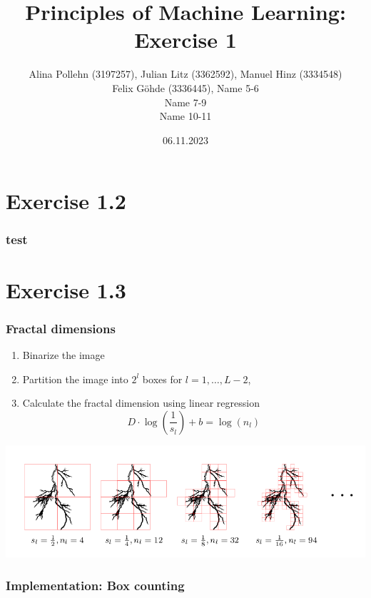 \documentclass[10pt,aspectratio=169,handout]{beamer}
\begin{document}
\title{Principles of Machine Learning: Exercise 1}
\date{06.11.2023}
\author{Alina Pollehn (3197257), Julian Litz (3362592), Manuel Hinz (3334548)\\Felix Göhde (3336445), Name 5-6 \\Name 7-9\\ Name 10-11}

\begin{frame}
    \maketitle
\end{frame}

\section{Exercise 1.2}

\begin{frame}
    \frametitle{test}
\end{frame}


\section{Exercise 1.3}

\begin{frame}
    \frametitle{Fractal dimensions}

    \begin{enumerate}
        \item Binarize the image
        \item Partition the image into $2^l$ boxes for $l=1,\dots,L-2$,
        \item Calculate the fractal dimension using linear regression \[D\cdot \log\left(\frac{1}{s_l}\right)+b=\log(n_l)\] 
    \end{enumerate}    
    \includegraphics[scale=0.4]{images/boxes.png}

\end{frame}

\begin{frame}
    \frametitle{Implementation: Box counting}
    \inputminted[bgcolor=LightGray,fontsize=\small]{python}{box_counting.py}
\end{frame}
\end{document}
